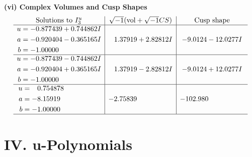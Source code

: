\documentclass[1p]{elsarticle_modified}
\theoremstyle{definition}
\newcommand{\I}{\sqrt{-1}}
\begin{document}
\newpage\flushleft \textbf{(vi) Complex Volumes and Cusp Shapes}
$$\begin{array}{c|c|c}  
\text{Solutions to }I^u_{3}& \I (\text{vol} + \sqrt{-1}CS) & \text{Cusp shape}\\
 \hline 
\begin{aligned}
u &= -0.877439 + 0.744862 I \\
a &= -0.920404 - 0.365165 I \\
b &= -1.00000\phantom{ +0.000000I}\end{aligned}
 & \phantom{-}1.37919 + 2.82812 I & -9.0124 - 12.0277 I \\ \hline\begin{aligned}
u &= -0.877439 - 0.744862 I \\
a &= -0.920404 + 0.365165 I \\
b &= -1.00000\phantom{ +0.000000I}\end{aligned}
 & \phantom{-}1.37919 - 2.82812 I & -9.0124 + 12.0277 I \\ \hline\begin{aligned}
u &= \phantom{-}0.754878\phantom{ +0.000000I} \\
a &= -8.15919\phantom{ +0.000000I} \\
b &= -1.00000\phantom{ +0.000000I}\end{aligned}
 & -2.75839\phantom{ +0.000000I} & -102.980\phantom{ +0.000000I}\\
 \hline 
 \end{array}$$\newpage
\newpage\renewcommand{\arraystretch}{1}
\centering \section*{ IV. u-Polynomials}
\end{document}
